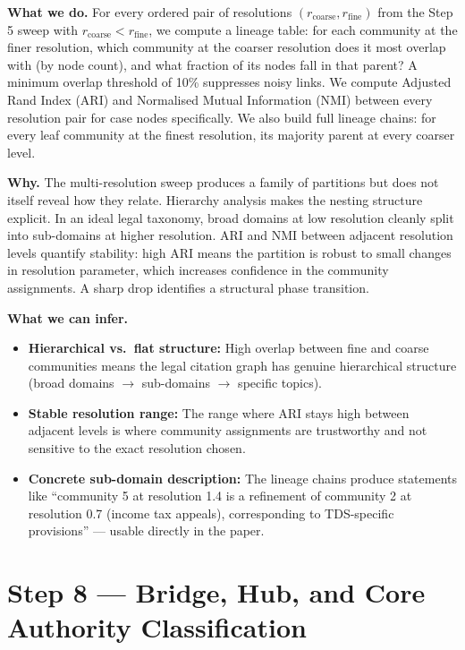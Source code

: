 \documentclass[11pt,a4paper]{article}
\begin{document}
\textbf{What we do.}
For every ordered pair of resolutions $(r_{\text{coarse}}, r_{\text{fine}})$ from the
Step 5 sweep with $r_{\text{coarse}} < r_{\text{fine}}$, we compute a lineage table:
for each community at the finer resolution, which community at the coarser resolution
does it most overlap with (by node count), and what fraction of its nodes fall in that
parent? A minimum overlap threshold of 10\% suppresses noisy links. We compute
Adjusted Rand Index (ARI) and Normalised Mutual Information (NMI) between every
resolution pair for case nodes specifically. We also build full lineage chains: for
every leaf community at the finest resolution, its majority parent at every coarser
level.

\textbf{Why.}
The multi-resolution sweep produces a family of partitions but does not itself reveal
how they relate. Hierarchy analysis makes the nesting structure explicit. In an ideal
legal taxonomy, broad domains at low resolution cleanly split into sub-domains at
higher resolution. ARI and NMI between adjacent resolution levels quantify stability:
high ARI means the partition is robust to small changes in resolution parameter, which
increases confidence in the community assignments. A sharp drop identifies a structural
phase transition.

\textbf{What we can infer.}
\begin{itemize}
  \item \textbf{Hierarchical vs.\ flat structure:} High overlap between fine and
    coarse communities means the legal citation graph has genuine hierarchical
    structure (broad domains $\to$ sub-domains $\to$ specific topics).
  \item \textbf{Stable resolution range:} The range where ARI stays high between
    adjacent levels is where community assignments are trustworthy and not sensitive
    to the exact resolution chosen.
  \item \textbf{Concrete sub-domain description:} The lineage chains produce statements
    like ``community 5 at resolution 1.4 is a refinement of community 2 at resolution
    0.7 (income tax appeals), corresponding to TDS-specific provisions'' --- usable
    directly in the paper.
\end{itemize}

\bigskip

\section{Step 8 \texorpdfstring{\textcolor{stepgray}{---}}{---} Bridge, Hub, and Core Authority Classification}
\end{document}
